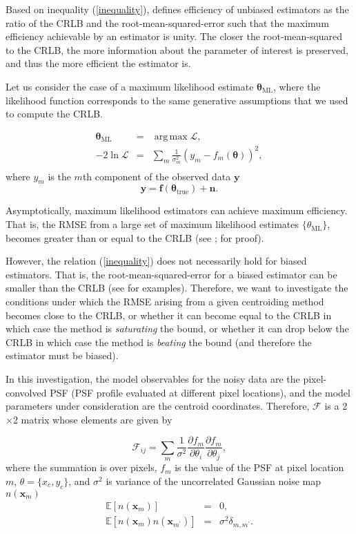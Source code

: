 \documentclass[12pt, preprint]{aastex}
\DeclareMathOperator*{\argmax}{arg\,max}
\newcommand{\beq}{\begin{equation}}
\newcommand{\eeq}{\end{equation}}
\begin{document}
Based on inequality (\ref{inequality}), \citet{cramer} defines efficiency of unbiased 
estimators as the ratio of the CRLB and the root-mean-squared-error such that the maximum efficiency 
achievable by an estimator is unity. The closer the root-mean-squared 
to the CRLB, the more information about the parameter of interest is preserved, and thus the more efficient 
the estimator is. 

Let us consider the case of a maximum likelihood estimate $\boldsymbol{\mathbf{\theta}}_{\text{ML}}$, where the likelihood function corresponds to the same generative assumptions that we used to compute the CRLB.

\begin{eqnarray}
\boldsymbol{\mathbf{\theta}}_{\text{ML}} &=& \argmax \mathcal{L}, \\
-2\ln \mathcal{L} &=& \sum_{m}\frac{1}{\sigma_{m}^{2}}( y_{m} - f_{m}(\boldsymbol{\mathbf{\theta}}))^{2}, \\
\end{eqnarray}
where $y_{m}$ is the $m$th component of the observed data $\mathbf{y}$
\beq
\mathbf{y} = \mathbf{f}(\boldsymbol{\mathbf{\theta}}_{\text{true}}) + \mathbf{n}.
\eeq

Asymptotically, maximum likelihood estimators can achieve maximum efficiency. That is, the RMSE from a 
large set of maximum likelihood estimates $\{\theta_{\text{ML}}\}$, 
becomes greater than or equal to the CRLB (see \citealt{cramer}; \citealt{lecam} for proof). 

However, the relation (\ref{inequality}) does not necessarily hold for biased estimators. That is, 
the root-mean-squared-error for a biased estimator can be smaller than the CRLB (see \citealt{lecam} for examples).
Therefore, we want to investigate the conditions under which the RMSE arising from a given centroiding method 
becomes close to the CRLB, or whether it can become equal to the CRLB in which case the method is \emph{saturating} 
the bound, or whether it can drop below the CRLB in which case the method is \emph{beating} the bound (and therefore the estimator must be biased).   
  
In this investigation, the model observables for the noisy data are the pixel-convolved PSF (PSF profile evaluated at different pixel locations), and  
the model parameters under consideration are the centroid coordinates. Therefore, $\mathcal{F}$
is a 2$\times$2 matrix whose elements are given by

\beq
  \mathcal{F}_{ij} = \sum_{m}\frac{1}{\sigma^{2}}
                \frac{\partial f_{m}}{\partial \theta_{i}}\frac{\partial f_{m}}{\partial \theta_{j}},
\label{fish}
\eeq
where the summation is over pixels, $f_{m}$ is the value of the PSF at pixel location $m$,
$\theta=\{x_{c},y_{c}\}$, and $\sigma^{2}$ is variance of the uncorrelated Gaussian noise map $n(\mathbf{x}_{m})$
\begin{eqnarray}
\mathbb{E}[n(\mathbf{x}_{m})] &=& 0, \\
\mathbb{E}[n(\mathbf{x}_{m})n(\mathbf{x}_{m^{\prime}})] &=& \sigma^{2}\delta_{m,m^{\prime}}. 
\end{eqnarray}
\end{document}
